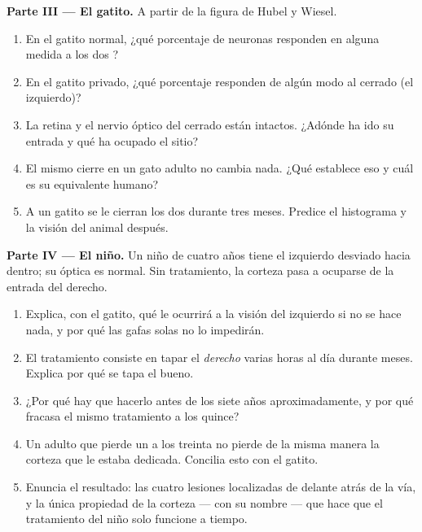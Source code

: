 \begin{problem}
\medskip
\noindent\textbf{Parte III --- El gatito.}
A partir de la figura de Hubel y Wiesel.
\begin{enumerate}[resume]
  \item En el gatito normal, ¿qué porcentaje de neuronas responden en
        alguna medida a los dos ?
  \item En el gatito privado, ¿qué porcentaje responden de algún modo
        al  cerrado (el izquierdo)?
  \item La retina y el nervio óptico del  cerrado están intactos.
        ¿Adónde ha ido su entrada y qué ha ocupado el sitio?
  \item El mismo cierre en un gato adulto no cambia nada. ¿Qué
        establece eso y cuál es su equivalente humano?
  \item A un gatito se le cierran los dos  durante tres meses.
        Predice el histograma y la visión del animal después.
\end{enumerate}

\medskip
\noindent\textbf{Parte IV --- El niño.}
Un niño de cuatro años tiene el  izquierdo desviado hacia dentro; su
óptica es normal. Sin tratamiento, la corteza pasa a ocuparse de la
entrada del  derecho.
\begin{enumerate}[resume]
  \item Explica, con el gatito, qué le ocurrirá a la visión del 
        izquierdo si no se hace nada, y por qué las gafas solas no lo
        impedirán.
  \item El tratamiento consiste en tapar el  \emph{derecho} varias
        horas al día durante meses. Explica por qué se tapa el 
        bueno.
  \item ¿Por qué hay que hacerlo antes de los siete años
        aproximadamente, y por qué fracasa el mismo tratamiento a los
        quince?
  \item Un adulto que pierde un  a los treinta no pierde de la misma
        manera la corteza que le estaba dedicada. Concilia esto con el
        gatito.
  \item Enuncia el resultado: las cuatro lesiones localizadas de
        delante atrás de la vía, y la única propiedad de la corteza ---
        con su nombre --- que hace que el tratamiento del niño solo
        funcione a tiempo.
\end{enumerate}
\end{problem}
